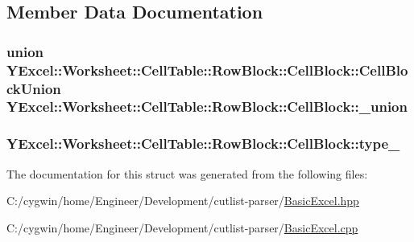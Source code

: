 \subsection{Member Data Documentation}
\hypertarget{struct_y_excel_1_1_worksheet_1_1_cell_table_1_1_row_block_1_1_cell_block_a418403ae6e7f95d395b4855d9f8ef216}{}
\subsubsection[{\+\_\+union}]{\setlength{\rightskip}{0pt plus 5cm}union {\bf Y\+Excel\+::\+Worksheet\+::\+Cell\+Table\+::\+Row\+Block\+::\+Cell\+Block\+::\+Cell\+Block\+Union} Y\+Excel\+::\+Worksheet\+::\+Cell\+Table\+::\+Row\+Block\+::\+Cell\+Block\+::\+\_\+union}\label{struct_y_excel_1_1_worksheet_1_1_cell_table_1_1_row_block_1_1_cell_block_a418403ae6e7f95d395b4855d9f8ef216}
\hypertarget{struct_y_excel_1_1_worksheet_1_1_cell_table_1_1_row_block_1_1_cell_block_aab613f72375c3df18b205059037b639a}{}
\subsubsection[{type\+\_\+}]{ Y\+Excel\+::\+Worksheet\+::\+Cell\+Table\+::\+Row\+Block\+::\+Cell\+Block\+::type\+\_\+}\label{struct_y_excel_1_1_worksheet_1_1_cell_table_1_1_row_block_1_1_cell_block_aab613f72375c3df18b205059037b639a}


The documentation for this struct was generated from the following files\+:\begin{DoxyCompactItemize}
\item 
C\+:/cygwin/home/\+Engineer/\+Development/cutlist-\/parser/\hyperlink{_basic_excel_8hpp}{Basic\+Excel.\+hpp}\item 
C\+:/cygwin/home/\+Engineer/\+Development/cutlist-\/parser/\hyperlink{_basic_excel_8cpp}{Basic\+Excel.\+cpp}\end{DoxyCompactItemize}
